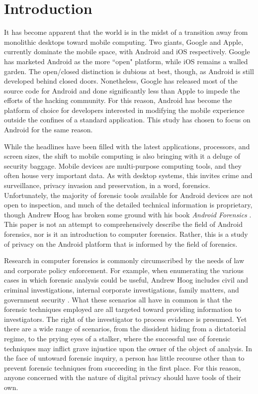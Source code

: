 \chapter{Introduction}
\label{ch:introduction}

It has become apparent that the world is in the midst of a transition away from monolithic desktops toward mobile computing.  Two
giants, Google and Apple, currently dominate the mobile space, with Android and iOS respectively.  Google has marketed Android as
the more ``open" platform, while iOS remains a walled garden.  The open/closed distinction is dubious at best, though, as Android is
still developed behind closed doors.  Nonetheless, Google has released most of the source code for Android and done significantly
less than Apple to impede the efforts of the hacking community. For this reason, Android has become the platform of choice for
developers interested in modifying the mobile experience outside the confines of a standard application.  This study has chosen
to focus on Android for the same reason.

While the headlines have been filled with the latest applications, processors, and screen sizes, the shift to mobile computing is
also bringing with it a deluge of security baggage. Mobile devices are multi-purpose computing tools, and they often house very
important data. As with desktop systems, this invites crime and surveillance, privacy invasion and preservation, in a
word, forensics.  Unfortunately, the majority of forensic tools available for Android devices are not open to inspection, and much
of the detailed technical information is proprietary, though Andrew Hoog has broken some ground with his book \emph{Android
Forensics} \cite{hoog}.  This paper is not an attempt to comprehensively describe the field of Android forensics, nor is it an
introduction to computer forensics. Rather, this is a study of privacy on the Android platform that is informed by the field of
forensics.

Research in computer forensics is commonly circumscribed by the needs of law and corporate policy enforcement.  For example, when
enumerating the various cases in which forensic analysis could be useful, Andrew Hoog includes civil and criminal investigations,
internal corporate investigations, family matters, and government security \cite{hoog}.  What these scenarios all have in common is
that the forensic techniques employed are all targeted toward providing information to investigators.  The right of the investigator
to process evidence is presumed.  Yet there are a wide range of scenarios, from the dissident hiding from a dictatorial regime, to
the prying eyes of a stalker, where the successful use of forensic techniques may inflict grave injustice upon the owner of the
object of analysis.  In the face of untoward forensic inquiry, a person has little recourse other than to prevent forensic
techniques from succeeding in the first place. For this reason, anyone concerned with the nature of digital privacy should have
tools of their own.  

